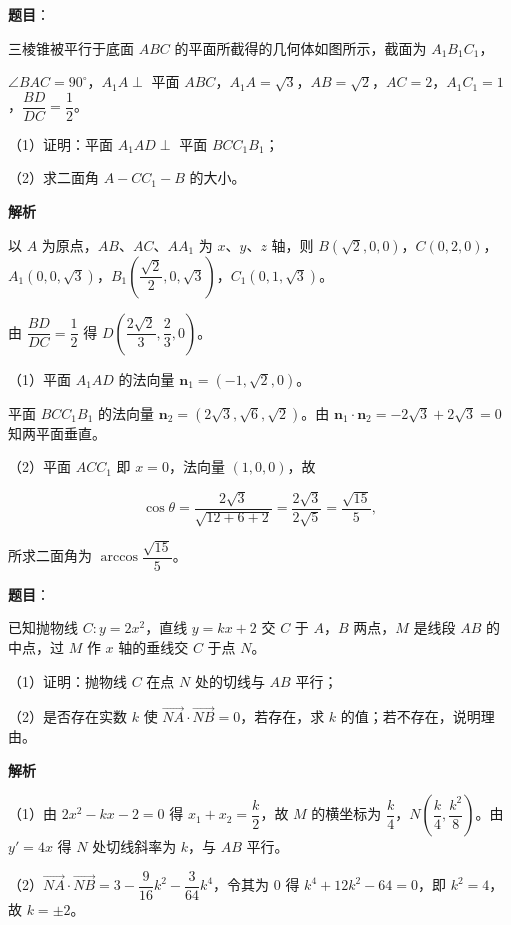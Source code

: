 \begin{answer}

\textbf{题目}：

三棱锥被平行于底面 $ABC$ 的平面所截得的几何体如图所示，截面为 $A_1B_1C_1$，

$\angle BAC=90^\circ$，$A_1A\perp$ 平面 $ABC$，$A_1A=\sqrt3$，$AB=\sqrt2$，$AC=2$，$A_1C_1=1$，$\dfrac{BD}{DC}=\dfrac12$。

（1）证明：平面 $A_1AD\perp$ 平面 $BCC_1B_1$；

（2）求二面角 $A-CC_1-B$ 的大小。
\nopagebreak[4]
\begin{center}\end{center}
\nopagebreak[4]
\textbf{解析}

以 $A$ 为原点，$AB$、$AC$、$AA_1$ 为 $x$、$y$、$z$ 轴，则 $B(\sqrt2,0,0)$，$C(0,2,0)$，$A_1(0,0,\sqrt3)$，$B_1\left(\dfrac{\sqrt2}2,0,\sqrt3\right)$，$C_1(0,1,\sqrt3)$。

由 $\dfrac{BD}{DC}=\dfrac12$ 得 $D\left(\dfrac{2\sqrt2}3,\dfrac23,0\right)$。

（1）平面 $A_1AD$ 的法向量 $\boldsymbol n_1=(-1,\sqrt2,0)$。

平面 $BCC_1B_1$ 的法向量 $\boldsymbol n_2=(2\sqrt3,\sqrt6,\sqrt2)$。由 $\boldsymbol n_1\cdot\boldsymbol n_2=-2\sqrt3+2\sqrt3=0$ 知两平面垂直。

（2）平面 $ACC_1$ 即 $x=0$，法向量 $(1,0,0)$，故

\nopagebreak[4]
\[\cos\theta=\frac{2\sqrt3}{\sqrt{12+6+2}}=\frac{2\sqrt3}{2\sqrt5}=\frac{\sqrt{15}}5,\]

所求二面角为 $\arccos\dfrac{\sqrt{15}}5$。


\end{answer}
\begin{answer}

\textbf{题目}：

已知抛物线 $C:y=2x^2$，直线 $y=kx+2$ 交 $C$ 于 $A$，$B$ 两点，$M$ 是线段 $AB$ 的中点，过 $M$ 作 $x$ 轴的垂线交 $C$ 于点 $N$。

（1）证明：抛物线 $C$ 在点 $N$ 处的切线与 $AB$ 平行；

（2）是否存在实数 $k$ 使 $\overrightarrow{NA}\cdot\overrightarrow{NB}=0$，若存在，求 $k$ 的值；若不存在，说明理由。

\textbf{解析}

（1）由 $2x^2-kx-2=0$ 得 $x_1+x_2=\dfrac k2$，故 $M$ 的横坐标为 $\dfrac k4$，$N\left(\dfrac k4,\dfrac{k^2}8\right)$。由 $y'=4x$ 得 $N$ 处切线斜率为 $k$，与 $AB$ 平行。

（2）$\overrightarrow{NA}\cdot\overrightarrow{NB}=3-\dfrac9{16}k^2-\dfrac3{64}k^4$，令其为 $0$ 得 $k^4+12k^2-64=0$，即 $k^2=4$，故 $k=\pm2$。


\end{answer}
